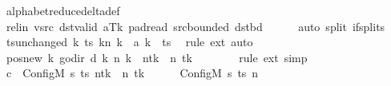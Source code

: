 \begin{isabellebody}
\ alphabet{\isacharunderscore}{\kern0pt}reduce{\isacharunderscore}{\kern0pt}delta{\isacharunderscore}{\kern0pt}def\isanewline
\ \ \ \ \isamarkupfalse%
\ rel{\isacharunderscore}{\kern0pt}in\ vsrc\ dst{\isacharunderscore}{\kern0pt}valid\ aTk\ pad{\isacharunderscore}{\kern0pt}read\ src{\isacharunderscore}{\kern0pt}bounded\ dst{\isacharunderscore}{\kern0pt}bd\isanewline
\ \ \ \ \isamarkupfalse%
\ {\isacharparenleft}{\kern0pt}auto\ split{\isacharcolon}{\kern0pt}\ if{\isacharunderscore}{\kern0pt}splits{\isacharparenright}{\kern0pt}\isanewline
\ \ \isamarkupfalse%
\ ts{\isacharunderscore}{\kern0pt}unchanged{\isacharcolon}{\kern0pt}\ {\isachardoublequoteopen}{\isacharparenleft}{\kern0pt}{\isasymlambda}k{\isachardot}{\kern0pt}\ {\isacharparenleft}{\kern0pt}ts\ k{\isacharparenright}{\kern0pt}{\isacharparenleft}{\kern0pt}n\ k\ {\isacharcolon}{\kern0pt}{\isacharequal}{\kern0pt}\ {\isacharquery}{\kern0pt}a\ k{\isacharparenright}{\kern0pt}{\isacharparenright}{\kern0pt}\ {\isacharequal}{\kern0pt}\ ts{\isachardoublequoteclose}\ \isamarkupfalse%
\ {\isacharparenleft}{\kern0pt}rule\ ext{\isacharparenright}{\kern0pt}\ auto\isanewline
\ \ \isamarkupfalse%
\ pos{\isacharunderscore}{\kern0pt}new{\isacharcolon}{\kern0pt}\ {\isachardoublequoteopen}{\isacharparenleft}{\kern0pt}{\isasymlambda}k{\isachardot}{\kern0pt}\ go{\isacharunderscore}{\kern0pt}dir\ {\isacharparenleft}{\kern0pt}{\isacharquery}{\kern0pt}d\ k{\isacharparenright}{\kern0pt}\ {\isacharparenleft}{\kern0pt}n\ k{\isacharparenright}{\kern0pt}{\isacharparenright}{\kern0pt}\ {\isacharequal}{\kern0pt}\ n{\isacharparenleft}{\kern0pt}tk\ {\isacharcolon}{\kern0pt}{\isacharequal}{\kern0pt}\ n\ tk\ {\isacharminus}{\kern0pt}\ {}{\isacharparenright}{\kern0pt}{\isachardoublequoteclose}\isanewline
\ \ \ \ \isamarkupfalse%
\ {\isacharparenleft}{\kern0pt}rule\ ext{\isacharparenright}{\kern0pt}\ simp\isanewline
\ \ \isamarkupfalse%
\ {\isacharquery}{\kern0pt}c{\isacharprime}{\kern0pt}{\isacharprime}{\kern0pt}\ {\isacharequal}{\kern0pt}\ {\isachardoublequoteopen}Config\isactrlsub M\ {\isacharquery}{\kern0pt}s{\isacharprime}{\kern0pt}\ ts\ {\isacharparenleft}{\kern0pt}n{\isacharparenleft}{\kern0pt}tk\ {\isacharcolon}{\kern0pt}{\isacharequal}{\kern0pt}\ n\ tk\ {\isacharminus}{\kern0pt}\ {}{\isacharparenright}{\kern0pt}{\isacharparenright}{\kern0pt}{\isachardoublequoteclose}\isanewline
\ \ \isamarkupfalse%
\ {\isachardoublequoteopen}{\isacharparenleft}{\kern0pt}Config\isactrlsub M\ {\isacharquery}{\kern0pt}s\ ts\ n{\isacharcomma}{\kern0pt}\isanewline

\end{isabellebody}
